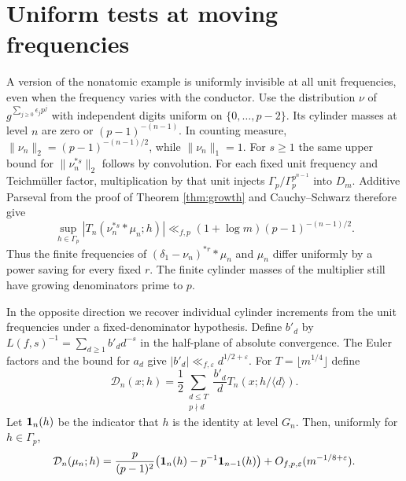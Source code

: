 \documentclass[11pt]{article}
\begin{document}
\section{Uniform tests at moving frequencies}

A version of the nonatomic example is uniformly invisible at all unit
frequencies, even when the frequency varies with the conductor. Use
the distribution \(\nu\) of \(g^{\sum_{j\ge0}\epsilon_jp^j}\) with
independent digits uniform on \(\{0,\ldots,p-2\}\). Its cylinder
masses at level \(n\) are zero or \((p-1)^{-(n-1)}\). In counting
measure,
\(\|\nu_n\|_2=(p-1)^{-(n-1)/2}\), while \(\|\nu_n\|_1=1\).
For \(s\ge1\) the same upper bound for \(\|\nu_n^{*s}\|_2\) follows
by convolution. For each fixed unit frequency and Teichm\"uller
factor, multiplication by that unit injects \(\Gamma_p/\Gamma_p^{p^{n-1}}\)
into \(D_m\). Additive Parseval from the proof of
Theorem \ref{thm:growth} and Cauchy--Schwarz therefore give
\[
 \sup_{h\in\Gamma_p}|T_n(\nu_n^{*s}*\mu_n;h)|
    \ll_{f,p}(1+\log m)(p-1)^{-(n-1)/2}.
\]
Thus the finite frequencies of \((\delta_1-\nu_n)^{*r}*\mu_n\) and
\(\mu_n\) differ uniformly by a power saving for every fixed \(r\).
The finite cylinder masses of the multiplier still have growing
denominators prime to \(p\).

In the opposite direction we recover individual cylinder increments
from the unit frequencies under a fixed-denominator hypothesis.
Define \(b'_d\) by \(L(f,s)^{-1}=\sum_{d\ge1}b'_d d^{-s}\)
in the half-plane of absolute convergence. The Euler factors and the
bound for \(a_d\) give \(|b'_d|\ll_{f,\varepsilon}d^{1/2+\varepsilon}\).
For \(T=\lfloor m^{1/4}\rfloor\) define
\[
 \mathcal D_n(x;h)=\frac12
   \sum_{\substack{d\le T\\p\nmid d}}\frac{b'_d}{d}
       T_n(x;h/\langle d\rangle).
\]
Let \({\bf1}_{n}(h)\) be the indicator that \(h\) is the identity
at level \(G_n\). Then, uniformly for \(h\in\Gamma_p\),
\begin{equation}\label{eq:spike}
 \mathcal D_n(\mu_n;h)=
   \frac{p}{(p-1)^2}\bigl({\bf1}_n(h)-p^{-1}{\bf1}_{n-1}(h)\bigr)
      +O_{f,p,\varepsilon}(m^{-1/8+\varepsilon}).
\end{equation}
\end{document}
